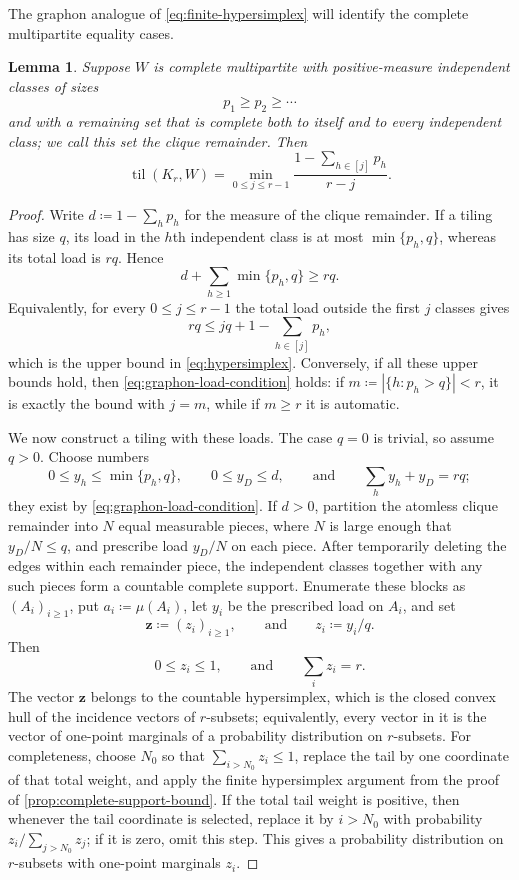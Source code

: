 \documentclass[10pt]{article}
\numberwithin{equation}{section}
\newtheorem{lemma}[lemma]{Lemma}
\newcommand{\til}{\operatorname{til}}
\newcommand{\vct}[1]{\boldsymbol{#1}}
\begin{document}
The graphon analogue of \cref{eq:finite-hypersimplex} will identify the complete multipartite equality cases.

\begin{lemma}\label{lem:hypersimplex}
Suppose $W$ is complete multipartite with positive-measure independent classes of sizes
\[
 p_1\ge p_2\ge\cdots
\]
and with a remaining set that is complete both to itself and to every independent class; we call this set the \emph{clique remainder}.  Then
\begin{equation}\label{eq:hypersimplex}
 \til(K_r,W)=\min_{0\le j\le r-1}
 \frac{1-\sum_{h\in[j]}p_h}{r-j}.
\end{equation}
\end{lemma}

\begin{proof}
Write $d\coloneqq1-\sum_hp_h$ for the measure of the clique remainder.  If a tiling has size $q$, its load in the $h$th independent class is at most $\min\{p_h,q\}$, whereas its total load is $rq$.  Hence
\begin{equation}\label{eq:graphon-load-condition}
 d+\sum_{h\ge1}\min\{p_h,q\}\ge rq.
\end{equation}
Equivalently, for every $0\le j\le r-1$ the total load outside the first $j$ classes gives
\[
 rq\le jq+1-\sum_{h\in[j]}p_h,
\]
which is the upper bound in \cref{eq:hypersimplex}.  Conversely, if all these upper bounds hold, then \cref{eq:graphon-load-condition} holds: if $m\coloneqq|\{h\colon p_h>q\}|<r$, it is exactly the bound with $j=m$, while if $m\ge r$ it is automatic.

We now construct a tiling with these loads.  The case $q=0$ is trivial, so assume $q>0$.  Choose numbers
\[
 0\le y_h\le\min\{p_h,q\},\qquad 0\le y_D\le d,
 \qquad\text{and}\qquad \sum_hy_h+y_D=rq;
\]
they exist by \cref{eq:graphon-load-condition}.  If $d>0$, partition the atomless clique remainder into $N$ equal measurable pieces, where $N$ is large enough that $y_D/N\le q$, and prescribe load $y_D/N$ on each piece.  After temporarily deleting the edges within each remainder piece, the independent classes together with any such pieces form a countable complete support.  Enumerate these blocks as $(A_i)_{i\ge1}$, put $a_i\coloneqq\mu(A_i)$, let $y_i$ be the prescribed load on $A_i$, and set
\[
 \vct z\coloneqq(z_i)_{i\ge1},
 \qquad\text{and}\qquad z_i\coloneqq y_i/q.
\]
Then
\[
 0\le z_i\le1,\qquad\text{and}\qquad \sum_i z_i=r.
\]
The vector $\vct z$ belongs to the countable hypersimplex, which is the closed convex hull of the incidence vectors of $r$-subsets; equivalently, every vector in it is the vector of one-point marginals of a probability distribution on $r$-subsets.  For completeness, choose $N_0$ so that $\sum_{i>N_0}z_i\le1$, replace the tail by one coordinate of that total weight, and apply the finite hypersimplex argument from the proof of \cref{prop:complete-support-bound}.  If the total tail weight is positive, then whenever the tail coordinate is selected, replace it by $i>N_0$ with probability $z_i/\sum_{j>N_0}z_j$; if it is zero, omit this step.  This gives a probability distribution on $r$-subsets with one-point marginals $z_i$.


\end{proof}
\end{document}
